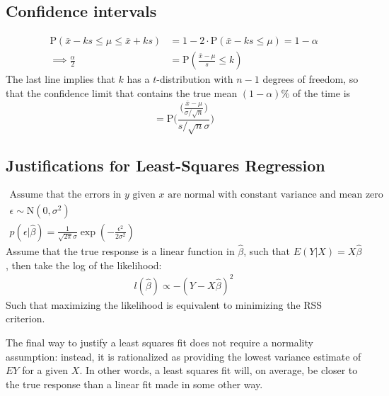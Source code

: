 \documentclass[11pt,a4paper,article]{memoir} %
\begin{document}
\subsection{Confidence intervals}
\begin{align}
	\text{P}(\bar{x} - ks \leq \mu \leq \bar{x} + ks) &= 1 - 2\cdot \text{P}(\bar{x} - ks \leq \mu) = 1 - \alpha \nonumber\\
	\implies \frac{\alpha}{2} &= \text{P}(\frac{\bar{x} - \mu}{s} \leq k) 
\end{align}
The last line implies that $k$ has a $t$-distribution with $n - 1$ degrees of freedom, so that the confidence limit that contains the true mean $(1 - \alpha)\%$ of the time is
\begin{equation}
	[\bar{x} - t_{n-1}(\alpha)\cdot s, \ \bar{x} + t_{n-1}(\alpha)\cdot s]
\end{equation}
\[
	 = \text{P}\Bigg(\frac{\Big(\frac{\bar{x} - \mu}{\sigma/\sqrt{n}}\Big)}{s/\sqrt{n}\sigma}\Bigg)
\]


\subsection{Justifications for Least-Squares Regression}
\begin{gather}
	\text{Assume that the errors in $y$ given $x$ are normal with constant variance and mean zero}\\
	\epsilon \sim \text{N}(0, \sigma^2) \\
	p(\epsilon|\hat{\beta}) = \frac{1}{\sqrt{2\pi}\sigma} \exp (-\frac{\epsilon^2}{2\sigma^2})
\end{gather}
Assume that the true response is a linear function in $\hat{\beta}$, such that $E(Y|X) = X\hat{\beta}$, then take the log of the likelihood:
\begin{gather}
	l(\hat{\beta}) \propto -(Y - X\hat{\beta})^2
\end{gather}
Such that maximizing the likelihood is equivalent to minimizing the RSS criterion.

The final way to justify a least squares fit does not require a normality assumption: instead, it is rationalized as providing the lowest variance estimate of $EY$ for a given $X$. In other words, a least squares fit will, on average, be closer to the true response than a linear fit made in some other way.
\end{document}
